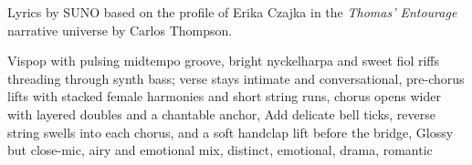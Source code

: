 
\begin{notes}
Lyrics by SUNO based on the profile of Erika Czajka in the \emph{Thomas’ Entourage} narrative universe by Carlos Thompson.
\end{notes}
\begin{style}
Vispop with pulsing midtempo groove, bright nyckelharpa and sweet fiol riffs threading through synth bass; verse stays intimate and conversational, pre-chorus lifts with stacked female harmonies and short string runs, chorus opens wider with layered doubles and a chantable anchor, Add delicate bell ticks, reverse string swells into each chorus, and a soft handclap lift before the bridge, Glossy but close-mic, airy and emotional mix, distinct, emotional, drama, romantic
\end{style}
